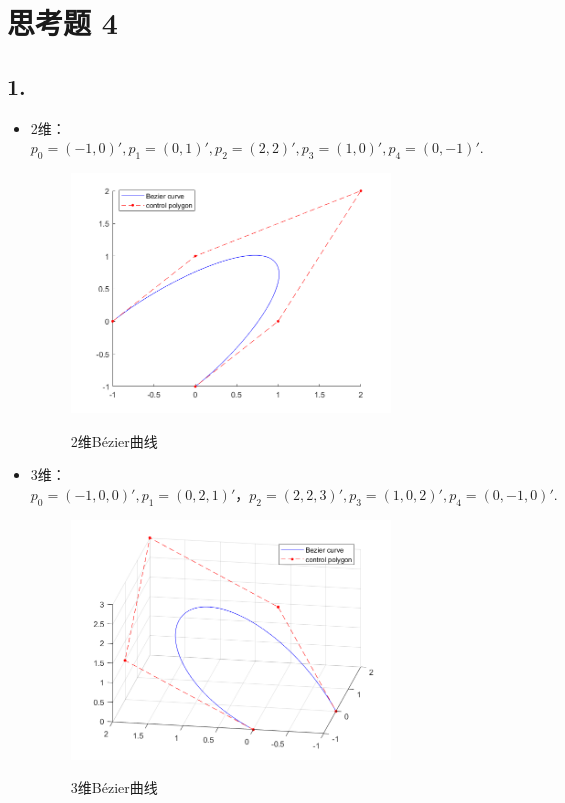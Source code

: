 \documentclass[utf8]{ctexart}
\begin{document}
\section*{思考题 4}
\subsection*{1.}
\begin{itemize}
    \item 2维：$p_0 = (-1,0)',
    p_1 = (0,1)',
    p_2 = (2,2)',
    p_3 = (1,0)',
    p_4 = (0,-1)'.$

    \begin{figure}[H]
        \centering
        \includegraphics[width=0.8\textwidth]{bezier_2d.png}
        \label{fig1}
        \caption{2维Bézier曲线}
    \end{figure}

    \item 3维：$p_0 = (-1,0,0)',
    p_1 = (0,2,1)'，
    p_2 = (2,2,3)',
    p_3 = (1,0,2)',
    p_4 = (0,-1,0)'.$
    \begin{figure}[H]
        \centering
        \includegraphics[width=0.8\textwidth]{bezier_3d.png}
        \label{fig2}
        \caption{3维Bézier曲线}
    \end{figure}
\end{itemize}
\end{document}
